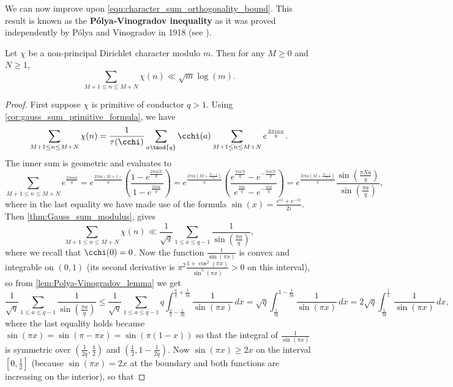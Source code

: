     We can now improve upon \cref{equ:character_sum_orthogonality_bound}. This result is known as the \textbf{P\'olya-Vinogradov inequality} as it was proved independently by P\'olya and Vinogradov in 1918 (see \cite{polya1918verteilung}).

    \begin{theorem}
      Let $\chi$ be a non-principal Dirichlet character modulo $m$. Then for any $M \ge 0$ and $N \ge 1$,
      \[
        \sum_{M+1 \le n \le M+N}\chi(n) \ll \sqrt{m}\log(m).
      \]
    \end{theorem}
    \begin{proof}
      First suppose $\chi$ is primitive of conductor $q > 1$. Using \cref{cor:gauss_sum_primitive_formula}, we have
      \[
        \sum_{M+1 \le n \le M+N}\chi(n) = \frac{1}{\tau(\cchi)}\sum_{a \tmod{q}}\cchi(a)\sum_{M+1 \le n \le M+N}e^{\frac{2\pi ian}{q}}.
      \]
      The inner sum is geometric and evaluates to
      \[
        \sum_{M+1 \le n \le M+N}e^{\frac{2\pi ian}{q}} = e^{\frac{2\pi ia(M+1)}{q}}\left(\frac{1-e^{\frac{2\pi iaN}{q}}}{1-e^{\frac{2\pi ia}{q}}}\right) = e^{\frac{2\pi ia\left(M+\frac{N-1}{2}\right)}{q}}\left(\frac{e^{\frac{\pi iaN}{q}}-e^{-\frac{\pi iaN}{q}}}{e^{\frac{\pi ia}{q}}-e^{-\frac{\pi ia}{q}}}\right) = e^{\frac{2\pi ia\left(M+\frac{N-1}{2}\right)}{q}}\frac{\sin\left(\frac{\pi Na}{q}\right)}{\sin\left(\frac{\pi a}{q}\right)},
      \]
      where in the last equality we have made use of the formula $\sin(x) = \frac{e^{ix}+e^{-ix}}{2i}$. Then \cref{thm:Gauss_sum_modulus}, gives
      \[
        \sum_{M+1 \le n \le M+N}\chi(n) \ll \frac{1}{\sqrt{q}}\sum_{1 \le a \le q-1}\frac{1}{\sin\left(\frac{\pi a}{q}\right)},
      \]
      where we recall that $\cchi(0) = 0$. Now the function $\frac{1}{\sin(\pi x)}$ is convex and integrable on $(0,1)$ (its second derivative is $\pi^{2}\frac{1+\cos^{2}(\pi x)}{\sin^{3}(\pi x)} > 0$ on this interval), so from \cref{lem:Polya-Vinogradov_lemma} we get
      \[
        \frac{1}{\sqrt{q}}\sum_{1 \le a \le q-1}\frac{1}{\sin\left(\frac{\pi a}{q}\right)} \le \frac{1}{\sqrt{q}}\sum_{1 \le a \le q-1}q\int_{\frac{a}{q}-\frac{1}{2q}}^{\frac{a}{q}+\frac{1}{2q}}\frac{1}{\sin(\pi x)}\,dx = \sqrt{q}\int_{\frac{1}{2q}}^{1-\frac{1}{2q}}\frac{1}{\sin(\pi x)}\,dx = 2\sqrt{q}\int_{\frac{1}{2q}}^{\frac{1}{2}}\frac{1}{\sin(\pi x)}\,dx,
      \]
      where the last equality holds because $\sin(\pi x) = \sin(\pi-\pi x) = \sin(\pi(1-x))$ so that the integral of $\frac{1}{\sin(\pi x)}$ is symmetric over $\left(\frac{1}{2q},\frac{1}{2}\right)$ and $\left(\frac{1}{2},1-\frac{1}{2q}\right)$. Now $\sin(\pi x) \ge 2x$ on the interval $[0,\frac{1}{2}]$ (because $\sin(\pi x) = 2x$ at the boundary and both functions are increasing on the interior), so that

\end{proof}
